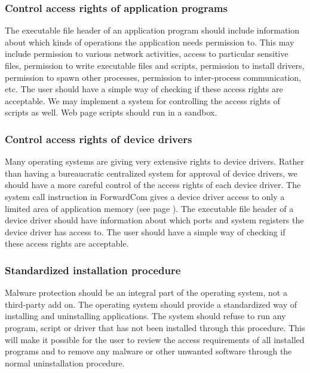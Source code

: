 \documentclass[forwardcom.tex]{subfiles}
\begin{document}
\subsubsection{Control access rights of application programs} 
The executable file header of an application program should include information about which kinds of operations the application needs permission to. This may include permission to various network activities, access to particular sensitive files, permission to write executable files and scripts, permission to install drivers, permission to spawn other processes, permission to inter-process communication, etc. The user should have a simple way of checking if these access rights are acceptable. We may implement a system for controlling the access rights of scripts as well. Web page scripts should run in a sandbox.

\subsubsection{Control access rights of device drivers} 
Many operating systems are giving very extensive rights to device drivers. Rather than having a bureaucratic centralized system for approval of device drivers, we should have a more careful control of the access rights of each device driver. The system call instruction in ForwardCom gives a device driver access to only a limited area of application memory (see page \pageref{systemCallInstruction}). The executable file header of a device driver should have information about which ports and system registers the device driver has access to. The user should have a simple way of checking if these access rights are acceptable.

\subsubsection{Standardized installation procedure} 
Malware protection should be an integral part of the operating system, not a third-party add on. The operating system should provide a standardized way of installing and uninstalling applications. The system should refuse to run any program, script or driver that has not been installed through this procedure. This will make it possible for the user to review the access requirements of all installed programs and to remove any malware or other unwanted software through the normal uninstallation procedure.
\end{document}
